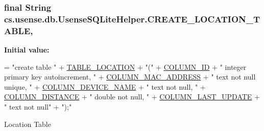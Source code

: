 \subsubsection[{C\+R\+E\+A\+T\+E\+\_\+\+L\+O\+C\+A\+T\+I\+O\+N\+\_\+\+T\+A\+B\+L\+E}]{\setlength{\rightskip}{0pt plus 5cm}final String cs.\+usense.\+db.\+Usense\+S\+Q\+Lite\+Helper.\+C\+R\+E\+A\+T\+E\+\_\+\+L\+O\+C\+A\+T\+I\+O\+N\+\_\+\+T\+A\+B\+L\+E\hspace{0.3cm}{\ttfamily [static]}, {\ttfamily [private]}}\label{classcs_1_1usense_1_1db_1_1_usense_s_q_lite_helper_ac9de9d33e9877311145ff8f227d08daf}
{\bfseries Initial value\+:}
\begin{DoxyCode}
= \textcolor{stringliteral}{"create table "}
            + \hyperlink{classcs_1_1usense_1_1db_1_1_usense_s_q_lite_helper_a69aa67c207caf3faf97265f325070f3f}{TABLE\_LOCATION} + \textcolor{stringliteral}{"("}
            + \hyperlink{classcs_1_1usense_1_1db_1_1_usense_s_q_lite_helper_ac0c4ad3a273f5adda9bdfc60e679379d}{COLUMN\_ID} + \textcolor{stringliteral}{" integer primary key autoincrement, "}
            + \hyperlink{classcs_1_1usense_1_1db_1_1_usense_s_q_lite_helper_ab4a4a2d02c76987c025ff64720b1f097}{COLUMN\_MAC\_ADDRESS} + \textcolor{stringliteral}{" text not null unique, "}
            + \hyperlink{classcs_1_1usense_1_1db_1_1_usense_s_q_lite_helper_a39dc3cc493eede77dd231fcd4aefaa1f}{COLUMN\_DEVICE\_NAME} + \textcolor{stringliteral}{" text not null, "}
            + \hyperlink{classcs_1_1usense_1_1db_1_1_usense_s_q_lite_helper_ad2ede2cc7ae1ff62a7eddbd25f2d29ef}{COLUMN\_DISTANCE} + \textcolor{stringliteral}{" double not null, "}
            + \hyperlink{classcs_1_1usense_1_1db_1_1_usense_s_q_lite_helper_a9d17bad17d0eb7ff5d8b96859f7506a4}{COLUMN\_LAST\_UPDATE} + \textcolor{stringliteral}{" text not null"}
            + \textcolor{stringliteral}{");"}
\end{DoxyCode}
Location Table \hypertarget{classcs_1_1usense_1_1db_1_1_usense_s_q_lite_helper_a6bb8975897d1187d215743a101a9783a}{}
